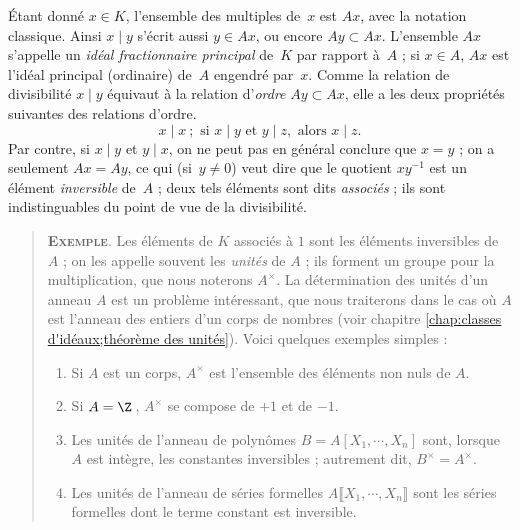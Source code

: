 \documentclass[11pt, useosf,
  title in boldface,
  theorem in new line,
  theorem numbering = section,
  number theorems separately,
]{simplivre}
\begin{document}
    Étant donné \( x \in K \), l'ensemble des multiples de~\( x \) est \( Ax \), avec la notation classique. Ainsi \( x \mid y \) s'écrit aussi \( y \in Ax \), ou encore \( Ay \subset Ax \). L'ensemble \( Ax \) s'appelle un \emph{idéal fractionnaire principal} de~\( K \) par rapport à~\( A \) ; si \( x \in A \), \( Ax \) est l'idéal principal (ordinaire) de~\( A \) engendré par~\( x \). Comme la relation de divisibilité \( x \mid y \) équivaut à la relation d'\emph{ordre} \( Ay \subset Ax \), elle a les deux propriétés suivantes des relations d'ordre.
    \begin{equation}
        x \mid x  ~;
        \text{ si } x \mid y \text{ et } y \mid z, \text{ alors } x \mid z.
    \end{equation}
    Par contre, si \( x \mid y \) et \( y \mid x \), on ne peut pas en général conclure que \( x = y \) ; on a seulement \( Ax = Ay \), ce qui (si~\( y \neq 0 \)) veut dire que le quotient \( x y^{-1} \) est un élément \emph{inversible} de~\( A \) ; deux tels éléments sont dits \emph{associés} ; ils sont indistinguables du point de vue de la divisibilité.

    \begin{quote}
        \textsc{\textbf{Exemple}}.
        Les éléments de \( K \) associés à \( 1 \) sont les éléments inversibles de \( A \) ; on les appelle souvent les \emph{unités} de \( A \) ; ils forment un groupe pour la multiplication, que nous noterons \( A^\times \). La détermination des unités d'un anneau \( A \) est un problème intéressant, que nous traiterons dans le cas où \( A \) est l'anneau des entiers d'un corps de nombres (voir chapitre \cref{chap:classes d'idéaux;théorème des unités}). Voici quelques exemples simples :
        \begin{enumerate}
            \item Si \( A \) est un corps, \( A^\times \) est l'ensemble des éléments non nuls de \( A \).
            \item Si \( A = \Z \)\,, \( A^\times \) se compose de \( +1 \) et de \( -1 \).
            \item Les unités de l'anneau de polynômes \( B = A[X_1, \cdots, X_n] \) sont, lorsque \( A \) est intègre, les constantes inversibles ; autrement dit, \( B^\times = A^\times \).
            \item Les unités de l'anneau de séries formelles \( A\lBrack X_1, \cdots, X_n \rBrack \) sont les séries formelles dont le terme constant est inversible.
        \end{enumerate}
    \end{quote}
\end{document}
